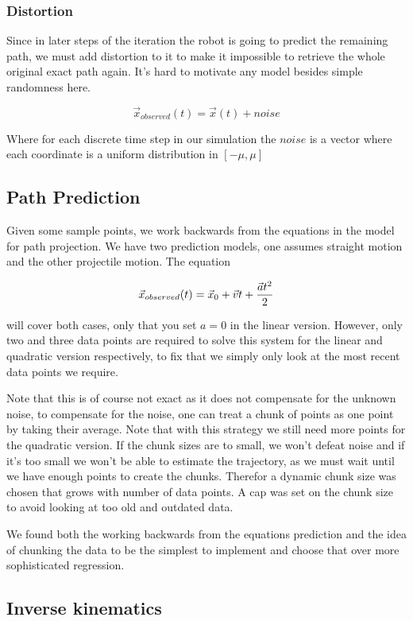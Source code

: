 \documentclass[letterpaper, 10 pt, conference]{ieeeconf}  %
\begin{document}
\subsubsection{Distortion}

Since in later steps of the iteration the robot is going to predict the
remaining path, we must add distortion to it to make it impossible to
retrieve the whole original exact path again. It's hard to motivate
any model besides simple randomness here.

\[
  \vec{x}_{observed}(t) = \vec{x}(t) + noise
\]

Where for each discrete time step in our simulation the $noise$ is a vector
where each coordinate is a uniform distribution in $[-\mu, \mu]$

\subsection{Path Prediction}

Given some sample points, we work backwards from the equations in the
model for path projection.  We have two prediction models, one assumes
straight motion and the other projectile motion.  The equation

\[
  \vec{x}_{observed}(t) = \vec{x}_0 + \vec{v}t + {\vec{a}t^2 \over 2}
\]

will cover both cases, only that you set $a=0$ in the linear version.
However, only two and three data points are required to solve this
system for the linear and quadratic version respectively, to fix that we
simply only look at the most recent data points we require.

Note that this is of course not exact as  it does not compensate for the
unknown noise, to compensate for the noise, one can treat a chunk of
points  as one point by taking their average. Note that with this
strategy we still need more points for the quadratic version. If the
chunk sizes are to small, we won't defeat noise and if it's too small we
won't be able to estimate the trajectory, as we must wait until we have
enough points to create the chunks. Therefor a dynamic chunk size was
chosen that grows with number of data points. A cap was set on the chunk
size to avoid looking at too old and outdated data.

We found both the working backwards from the equations prediction and
the idea of chunking the data to be the simplest to implement and choose
that over more sophisticated regression.

\subsection{Inverse kinematics}
\end{document}

